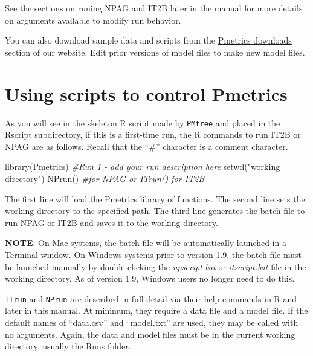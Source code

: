\documentclass[
]{book}
\newenvironment{Shaded}{\begin{snugshade}}{\end{snugshade}}
\newcommand{\CommentTok}[1]{\textcolor[rgb]{0.56,0.35,0.01}{\textit{#1}}}
\newcommand{\FunctionTok}[1]{\textcolor[rgb]{0.00,0.00,0.00}{#1}}
\newcommand{\NormalTok}[1]{#1}
\newcommand{\StringTok}[1]{\textcolor[rgb]{0.31,0.60,0.02}{#1}}
\begin{document}
See the sections on runing NPAG and IT2B later in the manual for more details on arguments available to modify run behavior.

You can also download sample data and scripts from the \href{http://lapk.org/pmetrics.php}{Pmetrics
downloads} section of our
website. Edit prior versions of model files to make new model files.

\hypertarget{using-scripts-to-control-pmetrics}{%
\section{Using scripts to control Pmetrics}\label{using-scripts-to-control-pmetrics}}

As you will see in the skeleton R script made by \texttt{PMtree} and placed in
the Rscript subdirectory, if this is a first-time run, the R commands to
run IT2B or NPAG are as follows. Recall that the ``\#'' character is a
comment character.

\begin{Shaded}
\begin{Highlighting}[]
\FunctionTok{library}\NormalTok{(Pmetrics)}
\CommentTok{\#Run 1 {-} add your run description here}
\FunctionTok{setwd}\NormalTok{(}\StringTok{"working directory"}\NormalTok{)}
\FunctionTok{NPrun}\NormalTok{() }\CommentTok{\#for NPAG or ITrun() for IT2B}
\end{Highlighting}
\end{Shaded}

The first line will load the Pmetrics library of functions. The second
line sets the working directory to the specified path. The third line
generates the batch file to run NPAG or IT2B and saves it to the working
directory.

\textbf{NOTE}: On Mac systems, the batch file will be automatically launched
in a Terminal window. On Windows systems prior to version 1.9, the batch
file must be launched manually by double clicking the \emph{npscript.bat} or
\emph{itscript.bat} file in the working directory. As of version 1.9, Windows
users no longer need to do this.

\texttt{ITrun} and \texttt{NPrun} are described in full detail via their help commands in R and later in this manual. At minimum, they require a data file and a model file. If the default names of ``data.csv'' and ``model.txt'' are used, they may be called with no arguments. Again, the data and model files must be in the current working directory, usually the Runs folder.
\end{document}
